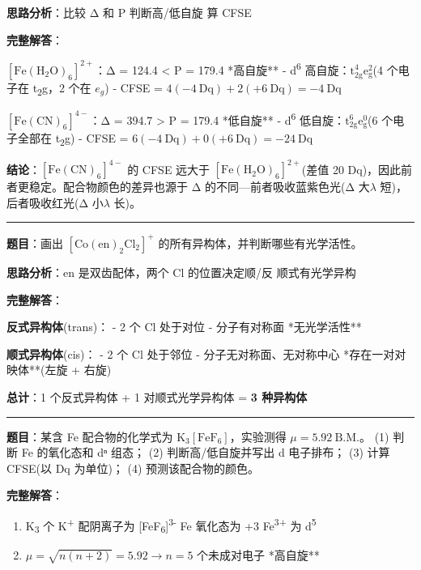 \textbf{思路分析}：比较 Δ 和 P \箭 判断高/低自旋 \箭 算 CFSE

\textbf{完整解答}：

\textbf{\([\mathrm{Fe(H_2O)_6}]^{2+}\)}：Δ = 124.4 \textless{} P = 179.4 \箭 **高自旋**
- d\textsuperscript{6} 高自旋：\(\mathrm{t_{2g}^4 e_g^2}\)(4 个电子在 t\textsubscript{2}g，2 个在 \(e_g\))
- CFSE = \(4(-4\ \mathrm{Dq}) + 2(+6\ \mathrm{Dq}) = -4\ \mathrm{Dq}\)

\textbf{\([\mathrm{Fe(CN)_6}]^{4-}\)}：Δ = 394.7 \textgreater{} P = 179.4 \箭 **低自旋**
- d\textsuperscript{6} 低自旋：\(\mathrm{t_{2g}^6 e_g^0}\)(6 个电子全部在 t\textsubscript{2}g)
- CFSE = \(6(-4\ \mathrm{Dq}) + 0(+6\ \mathrm{Dq}) = -24\ \mathrm{Dq}\)

\textbf{结论}：\([\mathrm{Fe(CN)_6}]^{4-}\) 的 CFSE 远大于 \([\mathrm{Fe(H_2O)_6}]^{2+}\)(差值 20 Dq)，因此前者更稳定。配合物颜色的差异也源于 Δ 的不同---前者吸收蓝紫色光(Δ 大\箭\(\lambda\) 短)，后者吸收红光(Δ 小\箭\(\lambda\) 长)。

\begin{center}\rule{0.5\linewidth}{0.5pt}\end{center}

\textbf{题目}：画出 \([\mathrm{Co(en)_2Cl_2}]^+\) 的所有异构体，并判断哪些有光学活性。

\textbf{思路分析}：en 是双齿配体，两个 Cl 的位置决定顺/反 \箭 顺式有光学异构

\textbf{完整解答}：

\textbf{反式异构体}(trans)：
- 2 个 Cl 处于对位
- 分子有对称面 \箭 **无光学活性**

\textbf{顺式异构体}(cis)：
- 2 个 Cl 处于邻位
- 分子无对称面、无对称中心 \箭 **存在一对对映体**(左旋 + 右旋)

\textbf{总计}：1 个反式异构体 + 1 对顺式光学异构体 = \textbf{3 种异构体}

\begin{center}\rule{0.5\linewidth}{0.5pt}\end{center}

\textbf{题目}：某含 Fe 配合物的化学式为 \(\mathrm{K_3[FeF_6]}\)，实验测得 \(\mu = 5.92\ \mathrm{B.M.}\)。
(1) 判断 Fe 的氧化态和 dⁿ 组态；
(2) 判断高/低自旋并写出 d 电子排布；
(3) 计算 CFSE(以 Dq 为单位)；
(4) 预测该配合物的颜色。

\textbf{完整解答}：

\begin{enumerate}
\def\labelenumi{(\arabic{enumi})}
\item
  K\textsubscript{3}  个 K\textsuperscript{+} \箭 配阴离子为 {[}FeF\textsubscript{6}{]}\textsuperscript{3-} \箭 Fe 氧化态为 +3 \箭 Fe\textsuperscript{3+} 为 d\textsuperscript{5}
\item
  \(\mu = \sqrt{n(n+2)} = 5.92 \rightarrow n = 5\)  个未成对电子 \箭 **高自旋**
\end{enumerate}

